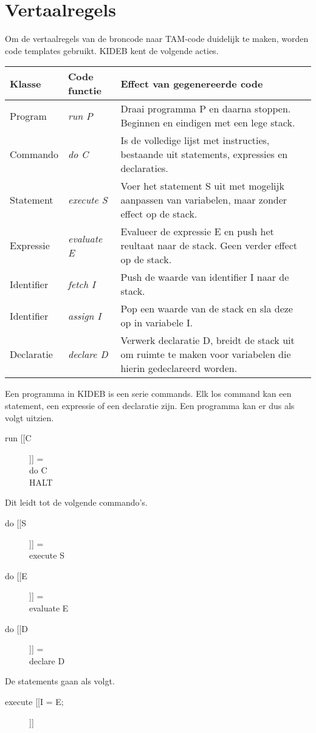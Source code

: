\chapter{Vertaalregels} %
\label{cha:vertaalregels}
Om de vertaalregels van de broncode naar TAM-code duidelijk te maken, worden code templates gebruikt. KIDEB kent de volgende acties.

\begin{tabular}{| l | l | p{6 cm} |}
    \hline
    Klasse & Code functie & Effect van gegenereerde code \\
    \hline
    Program & \emph{run P} & Draai programma P en daarna stoppen. Beginnen en eindigen met een lege stack. \\
    \hline
    Commando & \emph{do C} & Is de volledige lijst met instructies, bestaande uit statements, expressies en declaraties. \\
    \hline
    Statement & \emph{execute S} & Voer het statement S uit met mogelijk aanpassen van variabelen, maar zonder effect op de stack. \\
    \hline
    Expressie & \emph{evaluate E} & Evalueer de expressie E en push het reultaat naar de stack. Geen verder effect op de stack. \\
    \hline
    Identifier & \emph{fetch I} & Push de waarde van identifier I naar de stack. \\
    \hline
    Identifier & \emph{assign I} & Pop een waarde van de stack en sla deze op in variabele I. \\
    \hline
    Declaratie & \emph{declare D} & Verwerk declaratie D, breidt de stack uit om ruimte te maken voor variabelen die hierin gedeclareerd worden. \\
    \hline
\end{tabular} 

Een programma in KIDEB is een serie commands. Elk los command kan een statement, een expressie of een declaratie zijn. Een programma kan er dus als volgt uitzien.
\begin{description}
    \item[run [[C]]] = \hfill \\
        do C \\
        HALT
\end{description}

Dit leidt tot de volgende commando's.
\begin{description}
    \item[do [[S]]] = \hfill \\
        execute S
    \item[do [[E]]] = \hfill \\
        evaluate E
    \item[do [[D]]] = \hfill \\
        declare D 
\end{description}

De statements gaan als volgt.
\begin{description}
    \item[execute [[I = E;]]] 

\end{description}
\clearpage